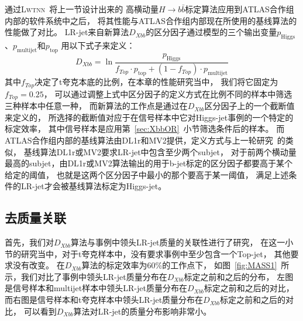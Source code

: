 通过\textsc{Lwtnn}~\cite{lwtnn}将上一节设计出来的
高横动量$H\rightarrow b\bar{b}$标定算法应用到ATLAS合作组内部的软件系统中之后，
将其性能与ATLAS合作组内部现在所使用的基线算法的性能做了对比。
LR-jet来自新算法$D_{Xbb}$的区分因子通过模型的三个输出变量$p_{\text{Higgs}}$、$p_{\text{multijet}}$和$p_{\text{top}}$
用以下式子来定义：
\begin{equation} 
\label{eq:discr}
D_{Xbb} = \ln\frac{p_{\text{Higgs}}}{f_{Top}\cdot p_{\text{top}} + (1-f_{Top})\cdot p_{\text{multijet}}} %
\end{equation}
其中$f_{Top}$决定了t夸克本底的比例，在本章的性能研究当中，
我们将它固定为$f_{Top}=0.25$，
可以通过调整上式中区分因子的定义方式在比例不同的样本中筛选三种样本中任意一种，
而新算法的工作点是通过在$D_{Xbb}$区分因子上的一个截断值来定义的，
所选择的截断值对应于在信号样本中它对Higgs-jet事例的一个特定的标定效率，
其中信号样本是应用第~\ref{sec:XbbOR}~小节筛选条件后的样本。
而ATLAS合作组内部的基线算法由DL1r和MV2提供，定义方式与上一轮研究~\cite{TAGGING5}的类似，
基线算法DL1r或MV2要求LR-jet中包含至少两个subjet，
对于前两个横动量最高的subjet，由DL1r或MV2算法输出的用于b-jet标定的区分因子都要高于某个给定的阈值，
也就是这两个区分因子中最小的那个要高于某一阈值，
满足上述条件的LR-jet才会被基线算法标定为Higgs-jet。

\subsection{去质量关联}
\label{sec:XbbPerf1}
首先，我们对$D_{Xbb}$算法与事例中领头LR-jet质量的关联性进行了研究，
在这一小节的研究当中，对于t夸克样本中，没有要求事例中至少包含一个Top-jet，
其他要求没有改变。
在$D_{Xbb}$算法的标定效率为60\%的工作点下，
如图~\ref{fig:MASS1}~所示，我们对比了事例中领头LR-jet质量分布在$D_{Xbb}$标定之前和之后的分布，
左图是信号样本和multijet样本中领头LR-jet质量分布在$D_{Xbb}$标定之前和之后的对比，
而右图是信号样本和t夸克样本中领头LR-jet质量分布在$D_{Xbb}$标定之前和之后的对比，
可以看到$D_{Xbb}$算法对LR-jet的质量分布影响非常小。

